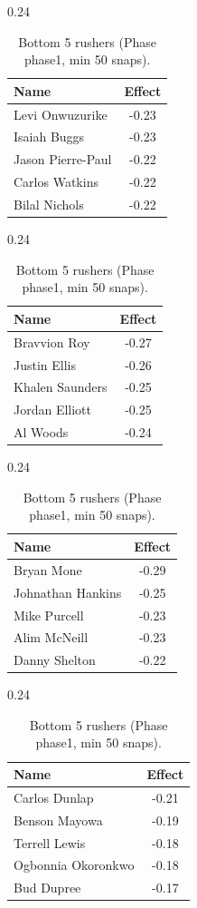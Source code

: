 \begin{table}[h!]
\centering
\begin{subtable}{0.24\textwidth}
\centering
\footnotesize
\begin{tabular}{lc}
\toprule
Name & Effect \\
\midrule
Levi Onwuzurike & -0.23 \\
Isaiah Buggs & -0.23 \\
Jason Pierre-Paul & -0.22 \\
Carlos Watkins & -0.22 \\
Bilal Nichols & -0.22 \\
\bottomrule
\end{tabular}
\caption{DE}
\end{subtable}
\hfill
\begin{subtable}{0.24\textwidth}
\centering
\footnotesize
\begin{tabular}{lc}
\toprule
Name & Effect \\
\midrule
Bravvion Roy & -0.27 \\
Justin Ellis & -0.26 \\
Khalen Saunders & -0.25 \\
Jordan Elliott & -0.25 \\
Al Woods & -0.24 \\
\bottomrule
\end{tabular}
\caption{DT}
\end{subtable}
\hfill
\begin{subtable}{0.24\textwidth}
\centering
\footnotesize
\begin{tabular}{lc}
\toprule
Name & Effect \\
\midrule
Bryan Mone & -0.29 \\
Johnathan Hankins & -0.25 \\
Mike Purcell & -0.23 \\
Alim McNeill & -0.23 \\
Danny Shelton & -0.22 \\
\bottomrule
\end{tabular}
\caption{NT}
\end{subtable}
\hfill
\begin{subtable}{0.24\textwidth}
\centering
\footnotesize
\begin{tabular}{lc}
\toprule
Name & Effect \\
\midrule
Carlos Dunlap & -0.21 \\
Benson Mayowa & -0.19 \\
Terrell Lewis & -0.18 \\
Ogbonnia Okoronkwo & -0.18 \\
Bud Dupree & -0.17 \\
\bottomrule
\end{tabular}
\caption{OLB}
\end{subtable}
\caption{Bottom 5 rushers (Phase phase1, min 50 snaps).}
\label{tab:rusher_pm_phase1_bot}
\end{table}
